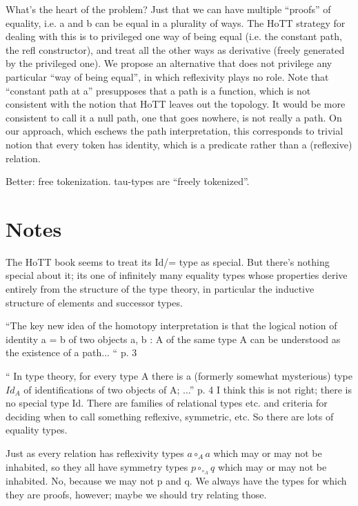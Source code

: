 \documentclass{article}
\begin{document}
What's the heart of the problem?  Just that we can have multiple
``proofs'' of equality, i.e. a and b can be equal in a plurality of
ways.  The HoTT strategy for dealing with this is to privileged one
way of being equal (i.e. the constant path, the refl constructor), and
treat all the other ways as derivative (freely generated by the
privileged one).  We propose an alternative that does not privilege
any particular ``way of being equal'', in which reflexivity plays no
role.  Note that ``constant path at a'' presupposes that a path is a
function, which is not consistent with the notion that HoTT leaves out
the topology.  It would be more consistent to call it a null path, one
that goes nowhere, is not really a path.  On our approach, which
eschews the path interpretation, this corresponds to trivial notion
that every token has identity, which is a predicate rather than a
(reflexive) relation.

Better: free tokenization.  tau-types are ``freely tokenized''.

\section{Notes}

The HoTT book seems to treat its Id/= type as special.  But there's
nothing special about it; its one of infinitely many equality types
whose properties derive entirely from the structure of the type
theory, in particular the inductive structure of elements and
successor types.

``The key new idea of the homotopy interpretation is that the logical notion of identity a = b of two objects a, b : A of the same type A can be understood as the existence of a path... `` p. 3

`` In type theory, for every type A there is a (formerly somewhat
mysterious) type \(Id_A\) of identifications of two objects of A; ...''
p. 4 I think this is not right; there is no special type Id.  There
are families of relational types etc. and criteria for deciding when
to call something reflexive, symmetric, etc.  So there are lots of
equality types.

Just as every relation has reflexivity types \(a\circ_A a\) which may
or may not be inhabited, so they all have symmetry types \(p
\circ_{\circ_A} q\) which may or may not be inhabited.  No, because we
may not p and q.  We always have the types for which they are proofs,
however; maybe we should try relating those.

\end{document}
